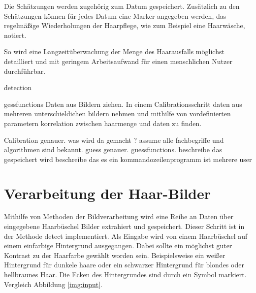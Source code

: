 \documentclass[german,a4paper,12pt]{llncs}
\begin{document}
Die Schätzungen werden zugehörig zum Datum gespeichert. 
Zusätzlich zu den Schätzungen können für jedes Datum eine Marker angegeben werden, das regelmäßige Wiederholungen der Haarpflege, wie zum Beispiel eine Haarwäsche, notiert.

So wird eine Langzeitüberwachung der Menge des Haarausfalls möglichst detailliert und mit geringem Arbeitsaufwand für einen menschlichen Nutzer durchführbar.

detection

gessfunctions
Daten aus Bildern ziehen. In einem Calibrationsschritt daten aus mehreren unterschieldichen bildern nehmen und mithilfe von vordefinierten parametern korrelation zwischen haarmenge und daten zu finden.

Calibration genauer. was wird da gemacht ? assume alle fachbegriffe und algorithmen sind bekannt.
guess genauer. guessfunctions. 
beschreibe das gespeichert wird
beschreibe das es ein kommandozeilenprogramm ist
mehrere user
\section{Verarbeitung der Haar-Bilder}

Mithilfe von Methoden der Bildverarbeitung wird eine Reihe an Daten über eingegebene Haarbüschel Bilder extrahiert und gespeichert.
Dieser Schritt ist in der Methode detect implementiert.
Als Eingabe wird von einem Haarbüschel auf einem einfarbige Hintergrund ausgegangen. Dabei sollte ein möglichst guter Kontrast zu der Haarfarbe gewählt worden sein. Beispielsweise ein weißer Hintergrund für dunkele haare oder ein schwarzer Hintergrund für blondes oder hellbraunes Haar. Die Ecken des Hintergrundes sind durch ein Symbol markiert. Vergleich Abbildung \ref{img:input}.
\end{document}
